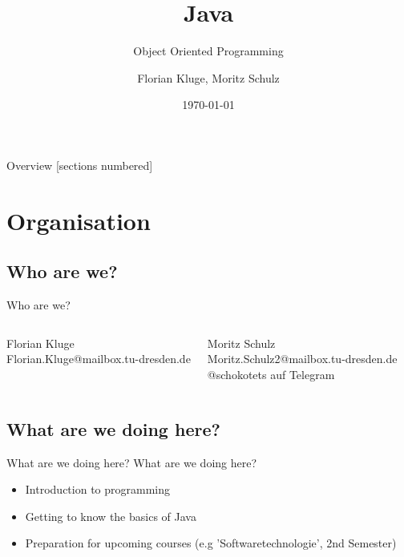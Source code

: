

\usepackage{tikz}
\usepackage{hyperref}
\hypersetup{
	colorlinks=true,
	linkcolor=darkgray,
	urlcolor=blue,
}


\title{Java}
\subtitle{Object Oriented  Programming}
\date{\today}
\author{Florian Kluge, Moritz Schulz}


\maketitle


\begin{frame}{Overview}
	[sections numbered]
	\tableofcontents[hideallsubsections]
\end{frame}




\section{Organisation}

\subsection{Who are we?}
\begin{frame}{Who are we?}

	\begin{columns}
		Florian Kluge\\
		Florian.Kluge@mailbox.tu-dresden.de



		Moritz Schulz\\
		Moritz.Schulz2@mailbox.tu-dresden.de\\
		@schokotets auf Telegram

	\end{columns}

\end{frame}

\subsection{What are we doing here?}
\begin{frame}{What are we doing here?}
	What are we doing here?
	\begin{itemize}
		\item Introduction to programming
		\item Getting to know the basics of Java
		\item Preparation for upcoming courses (e.g 'Softwaretechnologie', 2nd Semester)
	\end{itemize}
\end{frame}


